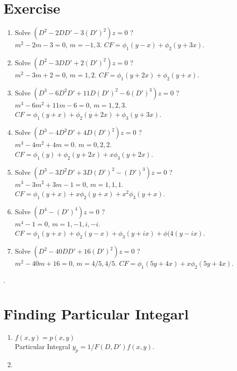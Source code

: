 \section{Exercise}
\begin{enumerate}
	\item Solve $(D^2-2DD' - 3(D')^2)z = 0$ ?\\
	$m^2 - 2m - 3 = 0$, $m = -1,3$.
	$CF = \phi_1(y-x) + \phi_2(y+3x)$.
	\item Solve $(D^2 -3DD' + 2(D')^2)z = 0$ ?\\
	$m^2 - 3m + 2 = 0$, $m = 1,2$.
	$CF = \phi_1(y+2x) + \phi_2(y+x)$.
	\item Solve $(D^3-6D^2D' + 11D(D')^2 - 6(D')^3)z = 0$ ?\\
	$m^3 - 6m^2 + 11m - 6 = 0$, $m = 1, 2, 3$.
	$CF = \phi_1(y+x) + \phi_2(y+2x) + \phi_3(y+3x)$.
	\item Solve  $(D^3 - 4D^2D' + 4D(D')^2)z = 0$ ?\\
	$m^3 - 4m^2 + 4m = 0$. $m = 0, 2,2$.
	$CF = \phi_1(y) + \phi_2(y+2x) + x\phi_3(y+2x)$.
	\item Solve $(D^3-3D^2D'+3D(D')^2 - (D')^3)z = 0$ ?\\
	$m^3 - 3m^2 + 3m -1 = 0$, $m = 1,1,1$.
	$CF = \phi_1(y+x) + x\phi_2(y+x) + x^2\phi_3(y+x)$.
	\item Solve $(D^4-(D')^4)z = 0$ ? \\
	$m^4 - 1 = 0$, $m = 1,-1,i,-i$.
	$CF = \phi_1(y+x) + \phi_2(y-x) + \phi_3(y+ix) + \phi(4(y-ix)$.
	\item Solve $(D^2 - 40DD' + 16(D')^2)z = 0$ ? \\
	$m^2 - 40m + 16 = 0$, $m = 4/5, 4/5$.
	$CF = \phi_1(5y+4x) + x\phi_2(5y+4x)$.
\end{enumerate}.

\section{Finding Particular Integarl}
\begin{enumerate}
	\item $f(x,y) = p(x,y)$\\
	Particular Integral $y_p = 1/F(D,D') f(x,y)$.
	\item
\end{enumerate}
